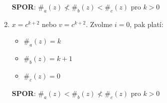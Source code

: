 \documentclass[11pt, a4paper]{article}
\begin{document}
\begin{enumerate}
\begin{multicols}{2}
\begin{itemize}[label={},noitemsep]
	      	\end{itemize}
	      	\columnbreak
	      	\textbf{SPOR}: $\#_a(z) \nless \#_b(z) < \#_c(z)$ pro $k > 0$
	      \end{multicols}
	\item $x = c^{k+2}$ nebo $v = c^{k+2}$. Zvolme $i = 0$, pak platí:
	      \begin{multicols}{2}
	      	\begin{itemize}[label={},noitemsep]
	      		\item $\#_a(z) = k$
	      		\item $\#_b(z) = k + 1$
	      		\item $\#_c(z) = 0$
	      	\end{itemize}
	      	\columnbreak
	      	\textbf{SPOR}: $\#_a(z) < \#_b(z) \nless \#_c(z)$ pro $k > 0$
	      \end{multicols}
\end{enumerate}
\end{document}
